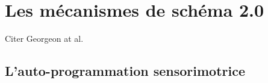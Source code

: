 \chapter{Les mécanismes de schéma 2.0}

Citer Georgeon at al. \cite{georgeon_2025_schema}


\section{L'auto-programmation sensorimotrice}



